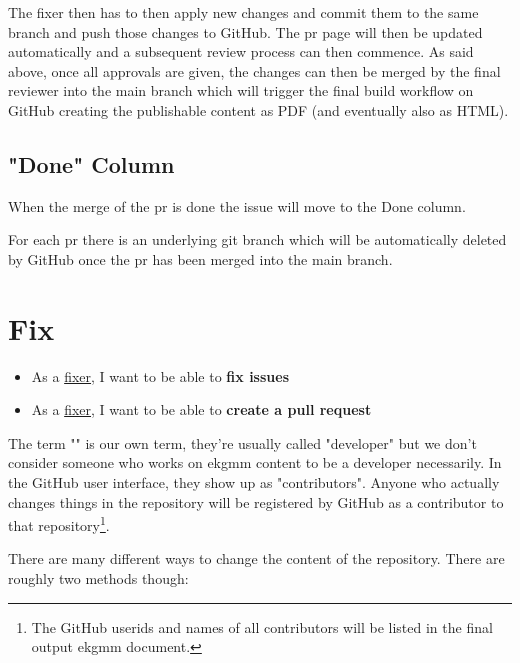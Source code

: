 The fixer then has to then apply new changes and commit 
them to the same branch and push those changes to GitHub. 
The \gls{pr} page will then be updated automatically and a subsequent 
review process can then commence.
As said above, once all approvals are given, 
the changes can then be merged by the final reviewer 
into the main branch which will trigger the final build 
workflow on GitHub creating the publishable content as 
PDF (and eventually also as HTML).

\subsection{"Done" Column}\label{subsec:ekg-mm-process-done-column}

When the merge of the \gls{pr} is done the issue will move to 
the Done column. 

For each \gls{pr} there is an underlying git branch which 
will be automatically deleted by GitHub once the \gls{pr} 
has been merged into the main branch.

\pagebreak
\section{Fix}
\label{sec:ekg-mm-process-fix}

\begin{tcolorbox}[colback=secondary!5,colframe=secondary!80,title=\textbf{User Stories}]
    \begin{itemize}[leftmargin=1em]
        \item As a \underline{fixer}, I want to be able to \textbf{fix issues}
        \item As a \underline{fixer}, I want to be able to \textbf{create a pull request}
    \end{itemize}
\end{tcolorbox}

The term "" is our own term, they’re usually called "developer" but
we don’t consider someone who works on \gls{ekgmm} content to be a developer necessarily.
In the GitHub user interface, they show up as "contributors".
Anyone who actually changes things in the repository will be registered by GitHub as 
a contributor to that repository\footnote{The GitHub userids and names of all 
contributors will be listed in the final output \gls{ekgmm} document.}.

There are many different ways to change the content of the repository. 
There are roughly two methods though:

